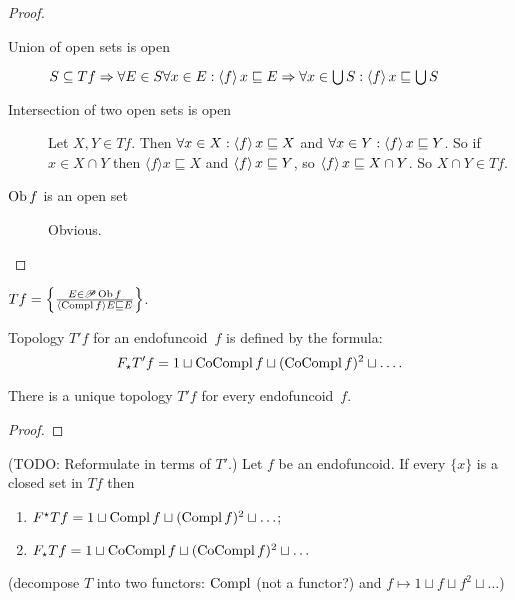 \begin{proof}
  
  \begin{description}
    \item[Union of open sets is open] $S \subseteq T f \Rightarrow \forall E
    \in S \forall x \in E : \left\langle f\right\rangle x \sqsubseteq E \Rightarrow
    \forall x \in \bigcup S : \left\langle f\right\rangle x \sqsubseteq \bigcup S$
    
    \item[Intersection of two open sets is open] Let $X, Y \in T f$. Then
    $\forall x \in X : \left\langle f\right\rangle x \sqsubseteq X$ and $\forall x \in Y
    : \left\langle f\right\rangle x \sqsubseteq Y$. So if $x \in X \cap Y$ then $\langle
    f \rangle x \sqsubseteq X$ and $\left\langle f\right\rangle x \sqsubseteq Y$, so
    $\left\langle f\right\rangle x \sqsubseteq X \cap Y$. So $X \cap Y \in T f$.
    
    \item[$\operatorname{Ob} f$ is an open set] Obvious.
  \end{description}
\end{proof}

\begin{obvious}
$T f = \left\{ \frac{ E \in \mathscr{P} \operatorname{Ob} f }{ \langle
\operatorname{Compl} f \rangle E \sqsubseteq E }\right\}$.
\end{obvious}

\begin{defn}
Topology $T'f$ for an endofuncoid~$f$ is defined by the formula:
\[
F_{\star} T' f =
1 \sqcup \operatorname{CoCompl} f \sqcup (\operatorname{CoCompl} f)^2 \sqcup \ldots.
\]
\end{defn}

\begin{prop}
There is a unique topology $T'f$ for every endofuncoid~$f$.
\end{prop}

\begin{proof}
 
\end{proof}

\begin{thm}
  (TODO: Reformulate in terms of $T'$.)
  Let $f$ be an endofuncoid. If every $\{ x \}$ is a closed set in $T f$ then
  \begin{enumerate}
    \item $F^{\star} T f = 1 \sqcup \operatorname{Compl} f \sqcup (\operatorname{Compl} f)^2
    \sqcup \ldots$;
    
    \item $F_{\star} T f = 1 \sqcup \operatorname{CoCompl} f \sqcup (\operatorname{CoCompl}
    f)^2 \sqcup \ldots$
  \end{enumerate}
  (decompose $T$ into two functors: $\operatorname{Compl}$ (not a functor?) and $f
  \mapsto 1 \sqcup f \sqcup f^2 \sqcup \ldots$)
\end{thm}

